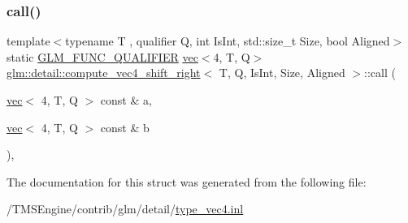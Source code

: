 \subsubsection{\texorpdfstring{call()}{call()}}
{\footnotesize\ttfamily template$<$typename T , qualifier Q, int Is\+Int, std\+::size\+\_\+t Size, bool Aligned$>$ \\
static \hyperlink{setup_8hpp_a33fdea6f91c5f834105f7415e2a64407}{G\+L\+M\+\_\+\+F\+U\+N\+C\+\_\+\+Q\+U\+A\+L\+I\+F\+I\+ER} \hyperlink{structglm_1_1vec}{vec}$<$4, T, Q$>$ \hyperlink{structglm_1_1detail_1_1compute__vec4__shift__right}{glm\+::detail\+::compute\+\_\+vec4\+\_\+shift\+\_\+right}$<$ T, Q, Is\+Int, Size, Aligned $>$\+::call (\begin{DoxyParamCaption}\item[{\hyperlink{structglm_1_1vec}{vec}$<$ 4, T, Q $>$ const \&}]{a,  }\item[{\hyperlink{structglm_1_1vec}{vec}$<$ 4, T, Q $>$ const \&}]{b }\end{DoxyParamCaption})\hspace{0.3cm}{\ttfamily [inline]}, {\ttfamily [static]}}



The documentation for this struct was generated from the following file\+:\begin{DoxyCompactItemize}
\item 
/\+T\+M\+S\+Engine/contrib/glm/detail/\hyperlink{type__vec4_8inl}{type\+\_\+vec4.\+inl}\end{DoxyCompactItemize}
